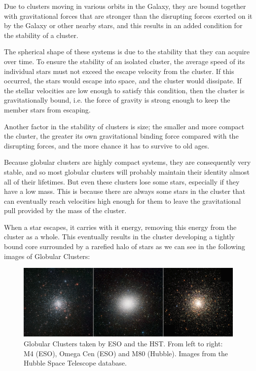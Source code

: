 Due to clusters moving in various orbits in the Galaxy, they are bound together with gravitational forces that are stronger than the disrupting forces exerted on it by the Galaxy or other nearby stars, and this results in an added condition for the stability of a cluster.

The spherical shape of these systems is due to the stability that they can acquire over time. To ensure the stability of an isolated cluster, the average speed of its individual stars must not exceed the escape velocity from the cluster. If this occurred, the stars would escape into space, and the cluster would dissipate. If the stellar velocities are low enough to satisfy this condition, then the cluster is gravitationally bound, i.e. the force of gravity is strong enough to keep the member stars from escaping.

Another factor in the stability of clusters is size; the smaller and more compact the cluster, the greater its own gravitational binding force compared with the disrupting forces, and the more chance it has to survive to old ages.

Because globular clusters are highly compact systems, they are consequently very stable, and so most globular clusters will probably maintain their identity almost all of their lifetimes. But even these clusters lose some stars, especially if they have a low mass. This is because there are always some stars in the cluster that can eventually reach velocities high enough for them to leave the gravitational pull provided by the mass of the cluster.

When a star escapes, it carries with it energy, removing this energy from the cluster as a whole. This eventually results in the cluster developing a tightly bound core surrounded by a rarefied halo of stars as we can see in the following images of Globular Clusters:

\begin{figure}[H]
\centering
\includegraphics[width=14.5cm]{images/3_gcs.png}
\caption[ESO and Hubble images of Globular Clusters]{Globular Clusters taken by ESO and the HST. From left to right: M4 (ESO), Omega Cen (ESO) and M80 (Hubble). Images from the Hubble Space Telescope database.}
\end{figure}

